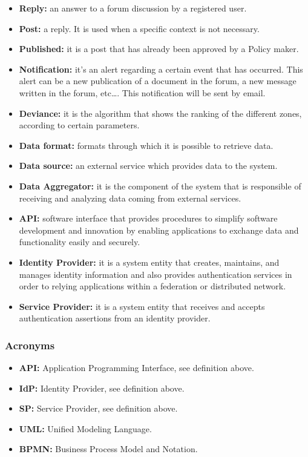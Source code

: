 \begin{itemize}
\item \textbf{Reply:} an answer to a forum discussion by a registered user.
\item \textbf{Post:} a reply. It is used when a specific context is not necessary.
\item \textbf{Published:} it is a post that has already been approved by a Policy maker.
\item \textbf{Notification:} it's an alert regarding a certain event that has occurred. This alert can be a new publication of a document in the forum, a new message written in the forum, etc…. This notification will be sent by email.
\item \textbf{Deviance:} it is the algorithm that shows the ranking of the different zones, according to certain parameters.
\item \textbf{Data format:} formats through which it is possible to retrieve data.
\item \textbf{Data source:} an external service which provides data to the system.
\item \textbf{Data Aggregator:} it is the component of the system that is responsible of receiving and analyzing data coming from external services.
\item \textbf{API:} software interface that provides procedures to simplify software development and innovation by enabling applications to exchange data and functionality easily and securely.
\item \textbf{Identity Provider:} it is a system entity that creates, maintains, and manages identity information and also provides authentication services in order to relying applications within a federation or distributed network.
\item \textbf{Service Provider:} it is a system entity that receives and accepts authentication assertions from an identity provider.
\end{itemize}

\subsubsection{Acronyms}
\begin{itemize}
    \item \textbf{API:} Application Programming Interface, see definition above.
    \item \textbf{IdP:} Identity Provider, see definition above.
    \item \textbf{SP:} Service Provider, see definition above.
    \item \textbf{UML:} Unified Modeling Language.
    \item \textbf{BPMN:} Business Process Model and Notation.
\end{itemize}


